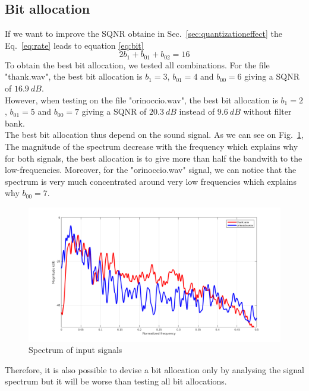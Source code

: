 \documentclass[a4paper,twocolumn]{article}
\begin{document}
\subsection{Bit allocation}
If we want to improve the SQNR obtaine in Sec.~\ref{sec:quantizationeffect} the Eq.~\ref{eq:rate} leads to equation \ref{eq:bit}
\begin{equation}
  \label{eq:bit}
  2b_{1}+b_{01}+b_{02}=16
\end{equation}
To obtain the best bit allocation, we tested all combinations. For the file "thank.wav", the best bit allocation is $b_{1}=3$, $b_{01}=4$ and $b_{00}=6$ giving a SQNR of $16.9~dB$.\\

However, when testing on the file "orinoccio.wav", the best bit allocation is $b_{1}=2$, $b_{01}=5$ and $b_{00}=7$ giving a SQNR of $20.3~dB$ instead of $9.6~dB$ without filter bank.\\

The best bit allocation thus depend on the sound signal. As we can see on Fig.~\ref{fig:spectrum}, The magnitude of the spectrum decrease with the frequency which explains why for both signals, the best allocation is to give more than half the bandwith to the low-frequencies. Moreover, for the "orinoccio.wav" signal, we can notice that the spectrum is very much concentrated around very low frequencies which explains why $b_{00}=7$.
\begin{figure}[!ht]
  \begin{center}
    \includegraphics[width=1.1\columnwidth]{spectrum3.png}
  \end{center}
  \caption{Spectrum of input signals}
  \label{fig:spectrum}
\end{figure}
Therefore, it is also possible to devise a bit allocation only by analysing the signal spectrum but it will be worse than testing all bit allocations.
\end{document}
